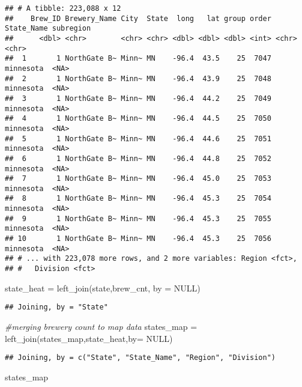 \documentclass[
]{article}
\newenvironment{Shaded}{\begin{snugshade}}{\end{snugshade}}
\newcommand{\AttributeTok}[1]{\textcolor[rgb]{0.77,0.63,0.00}{#1}}
\newcommand{\CommentTok}[1]{\textcolor[rgb]{0.56,0.35,0.01}{\textit{#1}}}
\newcommand{\ConstantTok}[1]{\textcolor[rgb]{0.00,0.00,0.00}{#1}}
\newcommand{\FunctionTok}[1]{\textcolor[rgb]{0.00,0.00,0.00}{#1}}
\newcommand{\NormalTok}[1]{#1}
\newcommand{\OtherTok}[1]{\textcolor[rgb]{0.56,0.35,0.01}{#1}}
\begin{document}
\begin{verbatim}
## # A tibble: 223,088 x 12
##    Brew_ID Brewery_Name City  State  long   lat group order State_Name subregion
##      <dbl> <chr>        <chr> <chr> <dbl> <dbl> <dbl> <int> <chr>      <chr>    
##  1       1 NorthGate B~ Minn~ MN    -96.4  43.5    25  7047 minnesota  <NA>     
##  2       1 NorthGate B~ Minn~ MN    -96.4  43.9    25  7048 minnesota  <NA>     
##  3       1 NorthGate B~ Minn~ MN    -96.4  44.2    25  7049 minnesota  <NA>     
##  4       1 NorthGate B~ Minn~ MN    -96.4  44.5    25  7050 minnesota  <NA>     
##  5       1 NorthGate B~ Minn~ MN    -96.4  44.6    25  7051 minnesota  <NA>     
##  6       1 NorthGate B~ Minn~ MN    -96.4  44.8    25  7052 minnesota  <NA>     
##  7       1 NorthGate B~ Minn~ MN    -96.4  45.0    25  7053 minnesota  <NA>     
##  8       1 NorthGate B~ Minn~ MN    -96.4  45.3    25  7054 minnesota  <NA>     
##  9       1 NorthGate B~ Minn~ MN    -96.4  45.3    25  7055 minnesota  <NA>     
## 10       1 NorthGate B~ Minn~ MN    -96.4  45.3    25  7056 minnesota  <NA>     
## # ... with 223,078 more rows, and 2 more variables: Region <fct>,
## #   Division <fct>
\end{verbatim}

\begin{Shaded}
\begin{Highlighting}[]
\NormalTok{state\_heat }\OtherTok{=} \FunctionTok{left\_join}\NormalTok{(state,brew\_cnt, }\AttributeTok{by =} \ConstantTok{NULL}\NormalTok{)}
\end{Highlighting}
\end{Shaded}

\begin{verbatim}
## Joining, by = "State"
\end{verbatim}

\begin{Shaded}
\begin{Highlighting}[]
\CommentTok{\#merging brewery count to map data}
\NormalTok{states\_map }\OtherTok{=} \FunctionTok{left\_join}\NormalTok{(states\_map,state\_heat,}\AttributeTok{by=} \ConstantTok{NULL}\NormalTok{)}
\end{Highlighting}
\end{Shaded}

\begin{verbatim}
## Joining, by = c("State", "State_Name", "Region", "Division")
\end{verbatim}

\begin{Shaded}
\begin{Highlighting}[]
\NormalTok{states\_map}
\end{Highlighting}
\end{Shaded}
\end{document}
